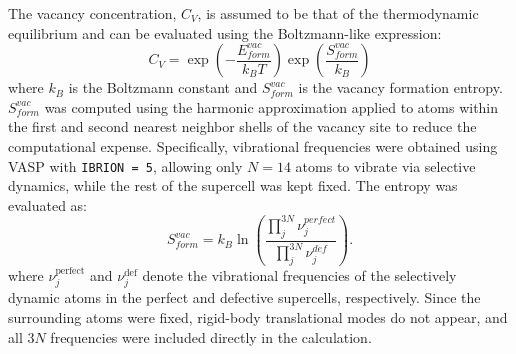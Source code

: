 \documentclass[preprint,12pt]{elsarticle}
\begin{document}
The vacancy concentration, $C_{V}$, is assumed to be that of the thermodynamic equilibrium and can be evaluated using the Boltzmann-like expression:
\begin{equation}
    C_{V} = \exp\left(-\frac{E_{form}^{vac}}{k_BT}\right) \exp\left(\frac{S_{form}^{vac}}{k_B}\right)
\end{equation}
where $k_B$ is the Boltzmann constant and $S_{form}^{vac}$ is the vacancy formation entropy. $S_{form}^{vac}$ was computed using the harmonic approximation applied to atoms within the first and second nearest neighbor shells of the vacancy site to reduce the computational expense. Specifically, vibrational frequencies were obtained using VASP with \texttt{IBRION = 5}, allowing only $N = 14$ atoms to vibrate via selective dynamics, while the rest of the supercell was kept fixed. The entropy was evaluated as:
\begin{equation}
   S_{form}^{vac} = k_B \ln\left(\frac{\prod^{3N}_j \nu_j^{perfect}}{\prod^{3N}_j \nu_j^{def}}\right).
\label{eq_entropy}
\end{equation}
where $\nu_j^{\text{perfect}}$ and $\nu_j^{\text{def}}$ denote the vibrational frequencies of the selectively dynamic atoms in the perfect and defective supercells, respectively. Since the surrounding atoms were fixed, rigid-body translational modes do not appear, and all $3N$ frequencies were included directly in the calculation.

\end{document}

